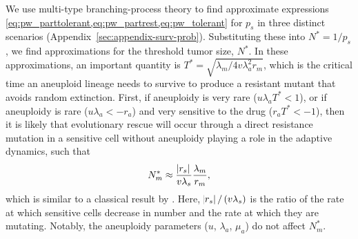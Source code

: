 \documentclass[12pt]{extarticle}
\renewcommand{\Delta}{r}
\begin{document}
We use multi-type branching-process theory to find approximate expressions \cref{eq:pw_parttolerant,eq:pw_partrest,eq:pw_tolerant} for $p_s$ in three distinct scenarios (Appendix~\ref{sec:appendix-surv-prob}). 
Substituting these into $N^*=1/p_s$, we find approximations for the threshold tumor size, $N^*$. 
In these approximations, an important quantity is $T^* = \sqrt{\lambda_m / 4 v \lambda_a^2 \Delta_m}$, which is the critical time an aneuploid lineage needs to survive to produce a resistant mutant that avoids random extinction.
First, if aneuploidy is very rare ($u\lambda_a T^*< 1$), or if aneuploidy is rare ($u\lambda_a < -\Delta_a$) and very sensitive to the drug ($\Delta_a T^* < -1$), then it is likely that evolutionary rescue will occur through a direct resistance mutation in a sensitive cell without aneuploidy playing a role in the adaptive dynamics, such that 
\begin{equation} \label{eq:N_m}
N_m^* \approx \frac{\abs{\Delta_s}}{v\lambda_s}  \frac{\lambda_m}{\Delta_m} ,
\end{equation}
which is similar to a classical result by \citet{orr2008population}. %
Here, $\abs{\Delta_s}/\left(v\lambda_s\right)$ is the ratio of the rate at which sensitive cells decrease in number and the rate at which they are mutating. Notably, the aneuploidy parameters ($u$, $\lambda_a$, $\mu_a$) do not affect $N_m^*$. 
\end{document}
